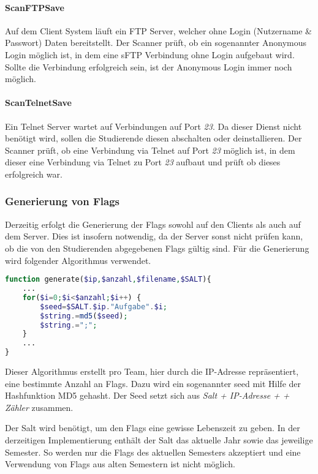 \paragraph{ScanFTPSave}\label{para:ScanFTPSave}
Auf dem Client System läuft ein FTP Server, welcher ohne Login (Nutzername \& Passwort) Daten bereitstellt. Der Scanner prüft, ob ein sogenannter Anonymous Login möglich ist, in dem eine sFTP Verbindung ohne Login aufgebaut wird. Sollte die Verbindung erfolgreich sein, ist der Anonymous Login immer noch möglich.

\paragraph{ScanTelnetSave}\label{para:ScanTelnetSave}
Ein Telnet Server wartet auf Verbindungen auf Port \textit{23}. Da dieser Dienst nicht benötigt wird, sollen die Studierende diesen abschalten oder deinstallieren. Der Scanner prüft, ob eine Verbindung via Telnet auf Port \textit{23} möglich ist, in dem dieser eine Verbindung via Telnet zu Port \textit{23} aufbaut und prüft ob dieses erfolgreich war.

\subsubsection{Generierung von Flags}\label{subsubsec:Generierung_von_Flags}

Derzeitig erfolgt die Generierung der Flags sowohl auf den Clients als auch auf dem Server. Dies ist insofern notwendig, da der Server sonst nicht prüfen kann, ob die von den Studierenden abgegebenen Flags gültig sind. Für die Generierung wird folgender Algorithmus verwendet.

\begin{lstlisting}[language=PHP,caption={Algorithmus zur Generiung der Flags},captionpos=b]
function generate($ip,$anzahl,$filename,$SALT){
	...
	for($i=0;$i<$anzahl;$i++) {
		$seed=$SALT.$ip."Aufgabe".$i;	
		$string.=md5($seed);
		$string.=";";
	}
	...
}
\end{lstlisting}

Dieser Algorithmus erstellt pro Team, hier durch die IP-Adresse repräsentiert, eine bestimmte Anzahl an Flags. Dazu wird ein sogenannter seed mit Hilfe der Hashfunktion MD5 gehasht. Der Seed setzt sich aus \textit{Salt + IP-Adresse +  + Zähler} zusammen.

Der Salt wird benötigt, um den Flags eine gewisse Lebenszeit zu geben. In der derzeitigen Implementierung enthält der Salt das aktuelle Jahr sowie das jeweilige Semester. So werden nur die Flags des aktuellen Semesters akzeptiert und eine Verwendung von Flags aus alten Semestern ist nicht möglich.

